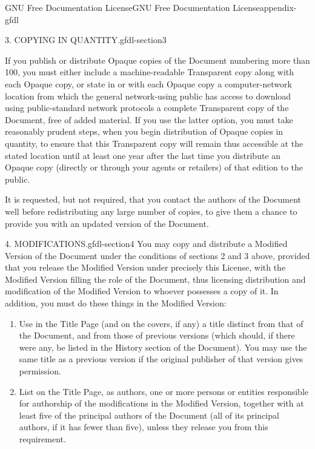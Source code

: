 \documentclass[oneside,10pt,]{book}
\numberwithin{equation}{section}
\begin{document}
\begin{appendixptx}{GNU Free Documentation License}{}{GNU Free Documentation License}{}{}{appendix-gfdl}
\begin{paragraphs}{3. COPYING IN QUANTITY.}{gfdl-section3}
\par
\hypertarget{p-1576}{}%
If you publish or distribute Opaque copies of the Document numbering more than 100, you must either include a machine-readable Transparent copy along with each Opaque copy, or state in or with each Opaque copy a computer-network location from which the general network-using public has access to download using public-standard network protocols a complete Transparent copy of the Document, free of added material. If you use the latter option, you must take reasonably prudent steps, when you begin distribution of Opaque copies in quantity, to ensure that this Transparent copy will remain thus accessible at the stated location until at least one year after the last time you distribute an Opaque copy (directly or through your agents or retailers) of that edition to the public.%
\par
\hypertarget{p-1577}{}%
It is requested, but not required, that you contact the authors of the Document well before redistributing any large number of copies, to give them a chance to provide you with an updated version of the Document.%
\end{paragraphs}%
\begin{paragraphs}{4. MODIFICATIONS.}{gfdl-section4}%
\hypertarget{p-1578}{}%
You may copy and distribute a Modified Version of the Document under the conditions of sections 2 and 3 above, provided that you release the Modified Version under precisely this License, with the Modified Version filling the role of the Document, thus licensing distribution and modification of the Modified Version to whoever possesses a copy of it. In addition, you must do these things in the Modified Version:%
\leavevmode%
\begin{enumerate}[label=\Alph*.]
\item\hypertarget{li-147}{}\hypertarget{p-1579}{}%
Use in the Title Page (and on the covers, if any) a title distinct from that of the Document, and from those of previous versions (which should, if there were any, be listed in the History section of the Document). You may use the same title as a previous version if the original publisher of that version gives permission.%
\item\hypertarget{li-148}{}\hypertarget{p-1580}{}%
List on the Title Page, as authors, one or more persons or entities responsible for authorship of the modifications in the Modified Version, together with at least five of the principal authors of the Document (all of its principal authors, if it has fewer than five), unless they release you from this requirement.%

\end{enumerate}
\end{paragraphs}
\end{appendixptx}
\end{document}

